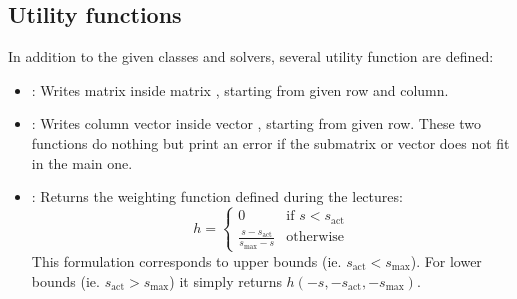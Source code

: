 \documentclass{ecnreport}
\begin{document}

% 

\subsection{Utility functions}
\label{util}

In addition to the given classes and solvers, several utility function are defined:
\begin{itemize}
 \item {}: Writes matrix  inside matrix , starting from given row and column.
 \item {}: Writes column vector  inside vector , starting from given row. These two functions do nothing but print an error
 if the submatrix or vector does not fit in the main one.
 \item {}: Returns the weighting function defined during the lectures:
 \begin{equation*}
  h = \left\{\begin{array}{cl}
              0 & \text{if } s < s_{\text{act}} \\
              \displaystyle \frac{s-s_{\text{act}}}{s_{\max}-s} & \text{otherwise}
             \end{array}\right.
 \end{equation*}This formulation corresponds to upper bounds (ie. $s_{\text{act}} < s_{\text{max}}$).
 For lower bounds (ie. $s_{\text{act}} > s_{\text{max}}$) it simply returns $h(-s,-s_{\text{act}}, -s_{\max})$.
\end{itemize}
\end{document}
